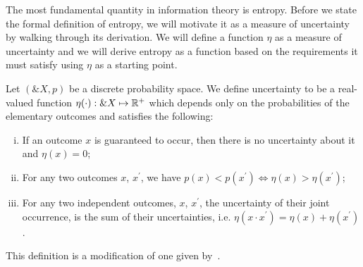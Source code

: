 The most fundamental quantity in information theory is entropy. Before we state
the formal definition of entropy, we will motivate it as a measure of
uncertainty by walking through its derivation. We will define a function $\eta$
as a measure of uncertainty and we will derive entropy as a function based on
the requirements it must satisfy using $\eta$ as a starting point.

\begin{definition}
  Let $(\&X, p)$ be a discrete probability space. We define
  \textnormal{\sffamily uncertainty} to be a real-valued function
  $\eta(\cdot): \&X \mapsto \mathbb{R}^+$ which depends only on the
  probabilities of the elementary outcomes and satisfies the
  following:
  \begin{enumerate}[(i)]
  \item If an outcome $x$ is guaranteed to occur, then there is no
    uncertainty about it and $\eta(x) = 0$;
  \item For any two outcomes $x$, $x^\prime$, we have $p(x) < p(x^\prime) \iff
    \eta(x) > \eta(x^\prime)$;
  \item For any two independent outcomes, $x$, $x^\prime$, the
    uncertainty of their joint occurrence, is the sum of their
    uncertainties, i.e.
    $\eta(x \cdot x^\prime) = \eta(x) + \eta(x^\prime)$.
  \end{enumerate}
\end{definition}
\begin{remark}
  This definition is a modification of one given
  by~\cite{ref:martin-2011}.
\end{remark}

